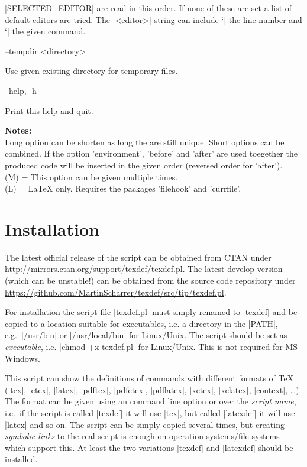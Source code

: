 \documentclass{ydoc}
\newenvironment{options}{%
    \def\cstart{\begingroup\ttfamily\par\noindent\ignorespaces}%
    \def\csep{\endgroup\begingroup\list {}{}\item \relax}%
    \def\cend{\endlist\par\medskip\endgroup\cstart}%
    \cstart
}{%
    \endgroup
}
\begin{document}
\begin{options}
                                                       |SELECTED_EDITOR| are read in this order. If none of these are set a list of default
                                                       editors are tried.  The |<editor>| string can include `|%
                                                       the line number and `|%
                                                       the given command.\cend
  --tempdir <directory>                              \csep Use given existing directory for temporary files.\cend
  --help, -h                                         \csep Print this help and quit.\cend
\end{options}

\noindent \textbf{Notes:}\\
 Long option can be shorten as long the are still unique.  Short options can be combined.
 If the option 'environment', 'before' and 'after' are used toegether the
 produced code will be inserted in the given order (reversed order for 'after').\\
 (M) = This option can be given multiple times.\\
 (L) = LaTeX only. Requires the packages 'filehook' and 'currfile'.


\section{Installation}\label{sec:install}

The latest official release of the script can be obtained from CTAN under \url{http://mirrors.ctan.org/support/texdef/texdef.pl}.
The latest develop version (which can be unstable!) can be obtained from the source code repository under 
\url{https://github.com/MartinScharrer/texdef/src/tip/texdef.pl}.

For installation the script file |texdef.pl| must simply renamed to |texdef| and be copied to a location suitable for executables,
i.e. a directory in the |PATH|, e.g.\ |/usr/bin| or |/usr/local/bin| for Linux/Unix.
The script should be set as \emph{executable}, i.e. |chmod +x texdef.pl| for Linux/Unix.
This is not required for MS Windows.

This script can show the definitions of commands with different formats of TeX
(|tex|, |etex|, |latex|, |pdftex|, |pdfetex|, |pdflatex|, |xetex|, |xelatex|, |context|, \ldots).
The format can be given using an command line option or over the \emph{script name},
i.e.\ if the script is called |texdef| it will use |tex|, but called |latexdef|
it will use |latex| and so on.
The script can be simply copied several times, but creating \emph{symbolic links}
to the real script is enough on operation systems/file systems which support
this.
At least the two variations |texdef| and |latexdef| should be installed.
\end{document}
